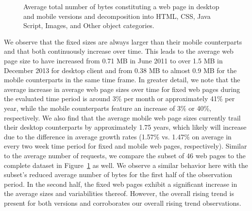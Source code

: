 \documentclass[journal,final]{IEEEtran}
\begin{document}
\begin{figure}
	\qquad
	\caption{Average total number of bytes constituting a web page in desktop and mobile versions and decomposition into  HTML, CSS, Java Script, Images, and Other object categories.\label{fig:sizes}}
\end{figure}

We observe that the fixed sizes are always larger than their mobile counterparts and that both continuously increase over time. 
This leads to the average web page size to have increased from 0.71 MB in June 2011 to over 1.5 MB in December 2013 for desktop client and from 0.38 MB to almost 0.9 MB for the mobile counterparts in the same time frame.
In greater detail, we note that the average increase in average web page sizes over time for fixed web pages during the evaluated time period is around 3\% per month or approximately 41\% per year, while the mobile counterparts feature an increase of 3\% or 40\%, respectively.
We also find that the average mobile web page sizes currently trail their desktop counterparts by approximately 1.75 years, which likely will increase due to the difference in average growth rates (1.57\% vs. 1.47\% on average in every two week time period for fixed and mobile web pages, respectively).
Similar to the average number of requests, we compare the subset of 46 web pages to the complete dataset in Figure~\ref{fig:sizes} as well.
We observe a similar behavior here with the subset's reduced average number of bytes for the first half of the observation period. In the second half, the fixed web pages exhibit a significant increase in the average sizes and variabilities thereof. 
However, the overall rising trend is present for both versions and corroborates our overall rising trend observations.
\end{document}
